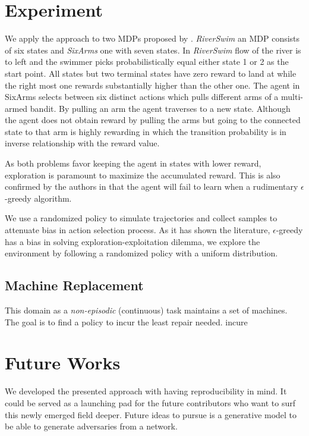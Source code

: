 \documentclass{article}
\begin{document}
\section{Experiment}
    We apply the approach to two MDPs proposed by \cite{Strehl2004}.
    \textit{RiverSwim} an MDP consists of six states and \textit{SixArms} one with seven states.
    In \textit{RiverSwim} flow of the river is to left and the swimmer picks probabilistically equal either state 1
    or 2 as the start point.
    All states but two terminal states have zero reward to land at while the right most one rewards substantially
    higher than the other one.
    The agent in SixArms selects between six distinct actions which pulls different arms of a multi-armed bandit.
    By pulling an arm the agent traverses to a new state.
    Although the agent does not obtain reward by pulling the arms but going to the connected state to that arm is
    highly rewarding in which the transition probability is in inverse relationship with the reward value.

    As both problems favor keeping the agent in states with lower reward, exploration is paramount to maximize the
    accumulated reward.
    This is also confirmed by the authors in \cite{Strehl2004} that the agent will fail to learn when a rudimentary
    $\epsilon$-greedy algorithm.

    We use a randomized policy to simulate trajectories and collect samples to attenuate bias in action selection
    process.
    As it has shown the literature, $\epsilon$-greedy has a bias in solving exploration-exploitation dilemma, we
    explore the environment by following a randomized policy with a uniform distribution.

    \subsection{Machine Replacement}
    This domain as a \textit{non-episodic} (continuous) task maintains a set of machines.
    The goal is to find a policy to incur the least repair needed.
    incure


\section{Future Works}
    We developed the presented approach with having reproducibility in mind.
    It could be served as a launching pad for the future contributors who want to surf this newly emerged field deeper.
    Future ideas to pursue is a generative model to be able to generate adversaries from a network.




\end{document}

